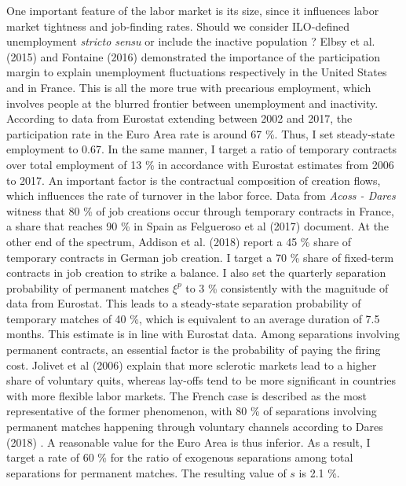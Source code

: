 \documentclass[a4paper]{article}
\begin{document}
One important feature of the labor market is its size, since it influences labor market tightness and job-finding rates. Should we consider ILO-defined unemployment \emph{stricto sensu} or include the inactive population ? Elbsy et al. (2015) and Fontaine (2016) demonstrated the importance of the participation margin to explain unemployment fluctuations respectively in the United States and in France. This is all the more true with precarious employment, which involves people at the blurred frontier between unemployment and inactivity. According to data from Eurostat extending between 2002 and 2017, the participation rate in the Euro Area rate is around 67 \%. Thus, I set steady-state employment to 0.67. In the same manner, I target a ratio of temporary contracts over total employment of 13 \% in accordance with Eurostat estimates from 2006 to 2017. An important factor is the contractual composition of creation flows, which influences the rate of turnover in the labor force. Data from \emph{Acoss - Dares} witness that 80 \% of job creations occur through temporary contracts in France, a share that reaches 90 \% in Spain as Felgueroso et al (2017) \cite{felgueroso2017recent} document. At the other end of the spectrum, Addison et al. (2018) \cite{Addison2018Worker} report a 45 \% share of temporary contracts in German job creation. I target a 70 \% share of fixed-term contracts in job creation to strike a balance. I also set the quarterly separation probability of permanent matches $\xi^p$ to 3 \% consistently with the magnitude of data from Eurostat. This leads to a steady-state separation probability of temporary matches of 40 \%, which is equivalent to an average duration of 7.5 months. This estimate is in line with Eurostat data. Among separations involving permanent contracts, an essential factor is the probability of paying the firing cost. Jolivet et al (2006) explain that more sclerotic markets lead to a higher share of voluntary quits, whereas lay-offs tend to be more significant in countries with more flexible labor markets. The French case is described as the most representative of the former phenomenon, with 80 \% of separations involving permanent matches happening through voluntary channels according to Dares (2018) \cite{dares062018}. A reasonable value for the Euro Area is thus inferior. As a result, I target a rate of 60 \% for the ratio of exogenous separations among total separations for permanent matches. The resulting value of $s$ is 2.1 \%.
\end{document}
